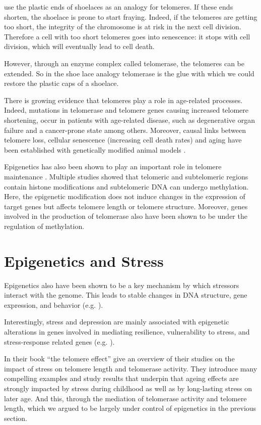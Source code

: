 \documentclass[
  11pt,
]{book}
\begin{document}
\citet{BlackburnEpel2017} use the plastic ends of shoelaces as an analogy for telomeres. If these ends shorten, the shoelace is prone to start fraying. Indeed, if the telomeres are getting too short, the integrity of the chromosome is at risk in the next cell division. Therefore a cell with too short telomeres goes into senescence: it stops with cell division, which will eventually lead to cell death.

However, through an enzyme complex called telomerase, the telomeres can be extended. So in the shoe lace analogy telomerase is the glue with which we could restore the plastic caps of a shoelace.

There is growing evidence that telomeres play a role in age-related processes. Indeed, mutations in telomerase and telomere genes causing increased telomere shortening, occur in patients with age-related disease, such as degenerative organ failure and a cancer-prone state among others. Moreover, causal links between telomere loss, cellular senescence (increasing cell death rates) and aging have been established with genetically modified animal models \citep{Adwan2018}.

Epigenetics has also been shown to play an important role in telomere maintenance \citep{Adwan2018}.
Multiple studies showed that telomeric and subtelomeric regions contain histone modifications and subtelomeric DNA can undergo methylation.
Here, the epigenetic modification does not induce changes in the expression of target genes but affects telomere length or telomere structure.
Moreover, genes involved in the production of telomerase also have been shown to be under the regulation of methylation.

\hypertarget{epigenetics-and-stress}{%
\section{Epigenetics and Stress}\label{epigenetics-and-stress}}

Epigenetics also have been shown to be a key mechanism by which stressors interact with the genome.
This leads to stable changes in DNA structure, gene expression, and behavior (e.g. \citet{Park2019}).

Interestingly, stress and depression are mainly
associated with epigenetic alterations in genes involved in mediating resilience, vulnerability to stress, and stress-response related genes (e.g. \citet{Park2019}).

In their book ``the telomere effect'' \citet{BlackburnEpel2017} give an overview of their studies on the impact of stress on telomere length and telomerase activity.
They introduce many compelling examples and study results that underpin that ageing effects are strongly impacted by stress during childhood as well as by long-lasting stress on later age. And this, through the mediation of telomerase activity and telomere length, which we argued to be largely under control of epigenetics in the previous section.
\end{document}
